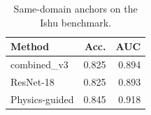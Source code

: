 \begin{table}[t]
\centering
\small
\caption{Same-domain anchors on the Ishu benchmark.}
\label{tab:same-domain-anchor}
\begin{tabular}{l r r}
\toprule
Method & Acc. & AUC \\
\midrule
combined\_v3 & 0.825 & 0.894 \\
ResNet-18 & 0.825 & 0.893 \\
Physics-guided & 0.845 & 0.918 \\
\bottomrule
\end{tabular}
\end{table}
